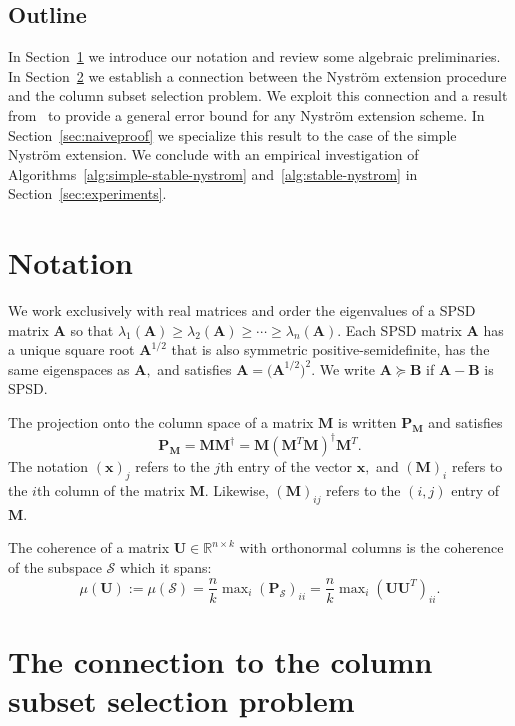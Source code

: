 \documentclass[11pt,letterpaper,twoside,reqno,nosumlimits]{amsart}
\def\pinv{\dagger}
\def\transp{T}
\newcommand{\mat}[1]{\ensuremath{\mathbf{#1}}}
\renewcommand{\vec}[1]{\ensuremath{\mathbf{#1}}}
\newcommand{\R}{\ensuremath{\mathbb{R}}}
\theoremstyle{remark}
\begin{document}
\subsection{Outline} In Section~\ref{sec:notation} we introduce our notation and review some algebraic preliminaries. In Section~\ref{sec:colselection} we establish a connection between the Nystr\"om extension procedure and the column subset selection problem. We exploit this connection and a result from~\cite{HMT11} to provide a general error bound for any Nystr\"om extension scheme. In Section~\ref{sec:naiveproof} we specialize this result to the case of the simple Nystr\"om extension. We conclude with an empirical investigation of Algorithms~\ref{alg:simple-stable-nystrom} and~\ref{alg:stable-nystrom} in Section~\ref{sec:experiments}.

\section{Notation}
\label{sec:notation}

We work exclusively with real matrices and order the eigenvalues of a SPSD matrix $\mat{A}$ so that $\lambda_1(\mat{A}) \geq \lambda_2(\mat{A}) \geq \cdots \geq \lambda_n(\mat{A}).$ Each SPSD matrix $\mat{A}$ has a unique square root $\mat{A}^{1/2}$ that is also symmetric positive-semidefinite, has the same eigenspaces as $\mat{A},$ and satisfies $\mat{A} = \big(\mat{A}^{1/2}\big)^2.$ We write $\mat{A} \succeq \mat{B}$ if $\mat{A} - \mat{B}$ is SPSD.

The projection onto the column space of a matrix $\mat{M}$ is written $\mat{P}_{\mat{M}}$ and satisfies
\[
\mat{P}_{\mat{M}} = \mat{M}\mat{M}^\pinv = \mat{M} (\mat{M}^\transp \mat{M})^\pinv \mat{M}^\transp.
\]
The notation $(\vec{x})_j$ refers to the $j$th entry of the vector $\vec{x},$ and $(\mat{M})_i$ refers to the $i$th column of the matrix $\mat{M}.$ Likewise, $(\mat{M})_{ij}$ refers to the $(i,j)$ entry of $\mat{M}.$

The coherence of a matrix $\mat{U} \in \R^{n\times k}$ with orthonormal columns is the coherence of the subspace $\mathcal{S}$ which it spans:
\[
\mu(\mat{U}) := \mu(\mathcal{S}) = \frac{n}{k} \max\nolimits_i (\mat{P}_{\mathcal{S}})_{ii} = \frac{n}{k} \max\nolimits_i (\mat{U}\mat{U}^\transp)_{ii}.
\]
\section{The connection to the column subset selection problem}
\label{sec:colselection}
\end{document}
